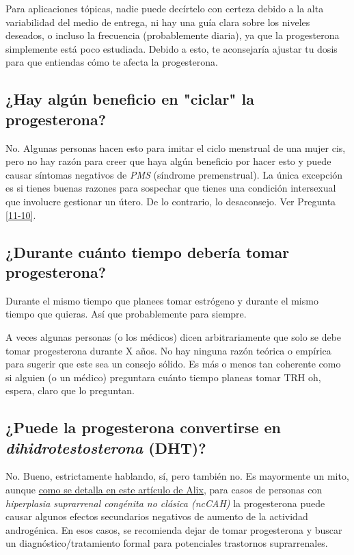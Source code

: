 \documentclass{article}
\begin{document}
Para aplicaciones tópicas, nadie puede decírtelo con certeza debido a la alta variabilidad del medio de entrega, ni hay una guía clara sobre los niveles deseados, o incluso la frecuencia (probablemente diaria), ya que la progesterona simplemente está poco estudiada. Debido a esto, te aconsejaría ajustar tu dosis para que entiendas cómo te afecta la progesterona.

\subsection{¿Hay algún beneficio en "ciclar" la progesterona?}\label{8-11}

No. Algunas personas hacen esto para imitar el ciclo menstrual de una mujer cis, pero no hay razón para creer que haya algún beneficio por hacer esto y puede causar síntomas negativos de \textit{PMS} (síndrome premenstrual). La única excepción es si tienes buenas razones para sospechar que tienes una condición intersexual que involucre gestionar un útero. De lo contrario, lo desaconsejo. Ver Pregunta \ref{11-10}.

\subsection{¿Durante cuánto tiempo debería tomar progesterona?}

Durante el mismo tiempo que planees tomar estrógeno y durante el mismo tiempo que quieras. Así que probablemente para siempre.

A veces algunas personas (o los médicos) dicen arbitrariamente que solo se debe tomar progesterona durante X años. No hay ninguna razón teórica o empírica para sugerir que este sea un consejo sólido. Es más o menos tan coherente como si alguien (o un médico) preguntara cuánto tiempo planeas tomar TRH \textemdash{}oh, espera, claro que lo preguntan.

\subsection{¿Puede la progesterona convertirse en \textit{dihidrotestosterona} (DHT)?}

No. Bueno, estrictamente hablando, sí, pero también no. Es mayormente un mito, aunque \href{https://whsah.co/posts/rethinking-progesterone-and-androgens/}{como se detalla en este artículo de Alix}, para casos de personas con \textit{hiperplasia suprarrenal congénita no clásica (ncCAH)} la progesterona puede causar algunos efectos secundarios negativos de aumento de la actividad androgénica. En esos casos, se recomienda dejar de tomar progesterona y buscar un diagnóstico/tratamiento formal para potenciales trastornos suprarrenales.
\end{document}
